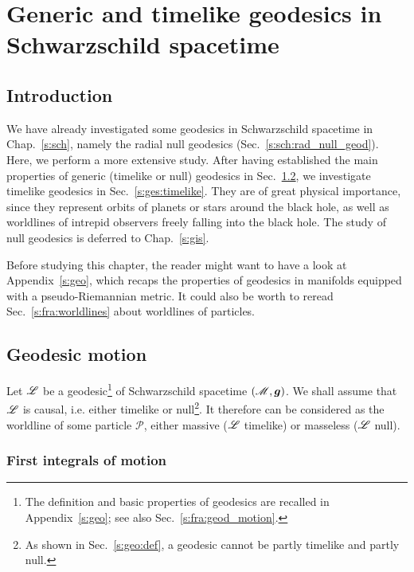 \chapter{Generic and timelike geodesics in Schwarzschild spacetime}
\label{s:ges}

\minitoc

\section{Introduction}

We have already investigated some geodesics in Schwarzschild spacetime in
Chap.~\ref{s:sch}, namely
the radial null geodesics (Sec.~\ref{s:sch:rad_null_geod}).
Here, we perform a more extensive study.
After having established the main properties of generic (timelike or null) geodesics
in Sec.~\ref{s:ges:geod_motion}, we investigate timelike
geodesics in Sec.~\ref{s:ges:timelike}. They
are of great physical importance, since they represent
orbits of planets or stars around the black hole, as well as worldlines of
intrepid observers freely falling into the black hole.
The study of null geodesics is deferred to Chap.~\ref{s:gis}.

Before studying this chapter, the reader might want to have a look at
Appendix~\ref{s:geo}, which recaps the properties of geodesics in
manifolds equipped with a pseudo-Riemannian metric.
It could also be worth to reread Sec.~\ref{s:fra:worldlines} about
worldlines of particles.

\section{Geodesic motion} \label{s:ges:geod_motion}

Let $\mathscr{L}$ be a geodesic\footnote{The definition and basic properties of geodesics
are recalled in Appendix~\ref{s:geo}; see also Sec.~\ref{s:fra:geod_motion}.} of Schwarzschild spacetime
$(\mathscr{M},\bm{g})$. We shall assume that $\mathscr{L}$ is causal, i.e. either timelike or null\footnote{As
shown in Sec.~\ref{s:geo:def}, a geodesic cannot be partly timelike and partly
null.}. It therefore can be considered as the worldline
of some particle $\mathscr{P}$, either massive
($\mathscr{L}$ timelike) or masseless ($\mathscr{L}$ null).


\subsection{First integrals of motion} \label{s:ges:fiom}

